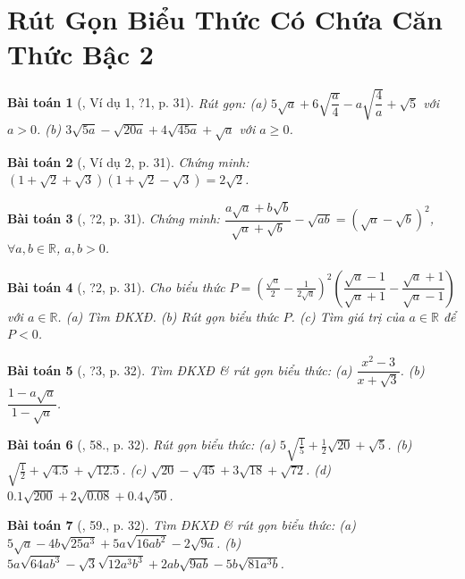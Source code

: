 \documentclass{article}
\newtheorem{baitoan}{Bài toán}
\begin{document}

\section{Rút Gọn Biểu Thức Có Chứa Căn Thức Bậc 2}

\begin{baitoan}[\cite{SGK_Toan_9_tap_1}, Ví dụ 1, ?1, p. 31]
	Rút gọn: (a) $5\sqrt{a} + 6\sqrt{\dfrac{a}{4}} - a\sqrt{\dfrac{4}{a}} + \sqrt{5}$ với $a > 0$. (b) $3\sqrt{5a} - \sqrt{20a} + 4\sqrt{45a} + \sqrt{a}$ với $a\ge0$.
\end{baitoan}

\begin{baitoan}[\cite{SGK_Toan_9_tap_1}, Ví dụ 2, p. 31]
	Chứng minh: $(1 + \sqrt{2} + \sqrt{3})(1 + \sqrt{2} - \sqrt{3}) = 2\sqrt{2}$.
\end{baitoan}

\begin{baitoan}[\cite{SGK_Toan_9_tap_1}, ?2, p. 31]
	Chứng minh: $\dfrac{a\sqrt{a} + b\sqrt{b}}{\sqrt{a} + \sqrt{b}} - \sqrt{ab} = (\sqrt{a} - \sqrt{b})^2$, $\forall a,b\in\mathbb{R}$, $a,b > 0$.
\end{baitoan}

\begin{baitoan}[\cite{SGK_Toan_9_tap_1}, ?2, p. 31]
	Cho biểu thức $P = \left(\frac{\sqrt{a}}{2} - \frac{1}{2\sqrt{a}}\right)^2\left(\dfrac{\sqrt{a} - 1}{\sqrt{a} + 1} - \dfrac{\sqrt{a} + 1}{\sqrt{a} - 1}\right)$ với $a\in\mathbb{R}$. (a) Tìm ĐKXĐ. (b) Rút gọn biểu thức $P$. (c) Tìm giá trị của $a\in\mathbb{R}$ để $P < 0$.
\end{baitoan}

\begin{baitoan}[\cite{SGK_Toan_9_tap_1}, ?3, p. 32]
	Tìm ĐKXĐ \& rút gọn biểu thức: (a) $\dfrac{x^2 - 3}{x + \sqrt{3}}$. (b) $\dfrac{1 - a\sqrt{a}}{1 - \sqrt{a}}$.
\end{baitoan}

\begin{baitoan}[\cite{SGK_Toan_9_tap_1}, 58., p. 32]
	Rút gọn biểu thức: (a) $5\sqrt{\frac{1}{5}} + \frac{1}{2}\sqrt{20} + \sqrt{5}$. (b) $\sqrt{\frac{1}{2}} + \sqrt{4.5} + \sqrt{12.5}$. (c) $\sqrt{20} - \sqrt{45} + 3\sqrt{18} + \sqrt{72}$. (d) $0.1\sqrt{200} + 2\sqrt{0.08} + 0.4\sqrt{50}$.
\end{baitoan}

\begin{baitoan}[\cite{SGK_Toan_9_tap_1}, 59., p. 32]
	Tìm ĐKXĐ \& rút gọn biểu thức: (a) $5\sqrt{a} - 4b\sqrt{25a^3} + 5a\sqrt{16ab^2} - 2\sqrt{9a}$. (b) $5a\sqrt{64ab^3} - \sqrt{3}\sqrt{12a^3b^3} + 2ab\sqrt{9ab} - 5b\sqrt{81a^3b}$.
\end{baitoan}
\end{document}
